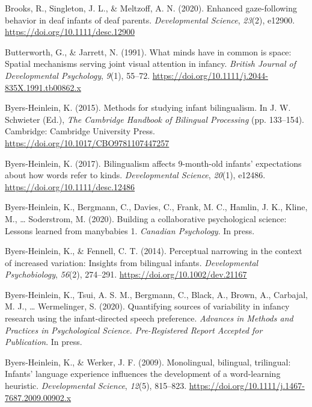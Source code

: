 \documentclass[english,,man,floatsintext]{apa6}
\begin{document}
\leavevmode\hypertarget{ref-Brooks_etal_2020}{}%
Brooks, R., Singleton, J. L., \& Meltzoff, A. N. (2020). Enhanced gaze-following behavior in deaf infants of deaf parents. \emph{Developmental Science}, \emph{23}(2), e12900. \url{https://doi.org/10.1111/desc.12900}

\leavevmode\hypertarget{ref-Butterworth_Jarrett_1991}{}%
Butterworth, G., \& Jarrett, N. (1991). What minds have in common is space: Spatial mechanisms serving joint visual attention in infancy. \emph{British Journal of Developmental Psychology}, \emph{9}(1), 55--72. \url{https://doi.org/10.1111/j.2044-835X.1991.tb00862.x}

\leavevmode\hypertarget{ref-Byers-Heinlein_2015}{}%
Byers-Heinlein, K. (2015). Methods for studying infant bilingualism. In J. W. Schwieter (Ed.), \emph{The Cambridge Handbook of Bilingual Processing} (pp. 133--154). Cambridge: Cambridge University Press. \url{https://doi.org/10.1017/CBO9781107447257}

\leavevmode\hypertarget{ref-Byers-Heinlein_2017}{}%
Byers-Heinlein, K. (2017). Bilingualism affects 9-month-old infants' expectations about how words refer to kinds. \emph{Developmental Science}, \emph{20}(1), e12486. \url{https://doi.org/10.1111/desc.12486}

\leavevmode\hypertarget{ref-Byers-Heinlein_etal_2020a}{}%
Byers-Heinlein, K., Bergmann, C., Davies, C., Frank, M. C., Hamlin, J. K., Kline, M., \ldots{} Soderstrom, M. (2020). Building a collaborative psychological science: Lessons learned from manybabies 1. \emph{Canadian Psychology}. In press.

\leavevmode\hypertarget{ref-Byers-Heinlein_Fennell_2014}{}%
Byers-Heinlein, K., \& Fennell, C. T. (2014). Perceptual narrowing in the context of increased variation: Insights from bilingual infants. \emph{Developmental Psychobiology}, \emph{56}(2), 274--291. \url{https://doi.org/10.1002/dev.21167}

\leavevmode\hypertarget{ref-Byers-Heinlein_etal_2020b}{}%
Byers-Heinlein, K., Tsui, A. S. M., Bergmann, C., Black, A., Brown, A., Carbajal, M. J., \ldots{} Wermelinger, S. (2020). Quantifying sources of variability in infancy research using the infant-directed speech preference. \emph{Advances in Methods and Practices in Psychological Science. Pre-Registered Report Accepted for Publication}. In press.

\leavevmode\hypertarget{ref-Byers-Heinlein_Werker_2009}{}%
Byers-Heinlein, K., \& Werker, J. F. (2009). Monolingual, bilingual, trilingual: Infants' language experience influences the development of a word-learning heuristic. \emph{Developmental Science}, \emph{12}(5), 815--823. \url{https://doi.org/10.1111/j.1467-7687.2009.00902.x}
\end{document}
